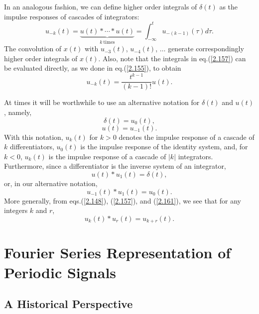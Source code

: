\documentclass[a4paper,twoside]{book}
\begin{document}
In an analogous fashion, we can define higher order integrals of $\delta(t)$ as the impulse responses of cascades of integrators:
\begin{equation}
    u_{-k}(t)=\underbrace{u(t)*\cdots*u(t)}_{k\mathrm{~times}}=\int_{-\infty}^{t}u_{-(k-1)}(\tau) d\tau.
    \label{2.157}
\end{equation}
The convolution of $x(t)$ with $u_{-3}(t)$, $u_{-4}(t)$, $\ldots$ generate correspondingly higher order integrals of $x(t)$. Also, note that the integrals in eq.\;(\ref{2.157}) can be evaluated directly, as we done in eq.\;(\ref{2.155}), to obtain
\begin{equation}
    u_{-k}(t)=\frac{t^{k-1}}{(k-1)!}u(t).
    \label{2.158}
\end{equation}

At times it will be worthwhile to use an alternative notation for $\delta(t)$ and $u(t)$, namely,
\begin{equation}
    \delta(t)=u_0(t),
    \label{2.159}
\end{equation}
\begin{equation}
    u(t)=u_{-1}(t).
    \label{2.160}
\end{equation}
With this notation, $u_k(t)$ for $k>0$ denotes the impulse response of a cascade of $k$ differentiators, $u_0(t)$ is the impulse response of the identity system, and, for $k<0$, $u_k(t)$ is the impulse response of a cascade of $|k|$ integrators. Furthermore, since a differentiator is the inverse system of an integrator, $$u(t)*u_1(t)=\delta(t),$$ or, in our alternative notation,
\begin{equation}
    u_{-1}(t)*u_1(t)=u_0(t).
    \label{2.161}
\end{equation}
More generally, from eqs.\;(\ref{2.148}), (\ref{2.157}), and (\ref{2.161}), we see that for any integers $k$ and $r$,
\begin{equation}
    u_k(t)*u_r(t)=u_{k+r}(t).
    \label{2.162}
\end{equation}

\chapter{Fourier Series Representation of Periodic Signals}
\section{A Historical Perspective}
\end{document}
